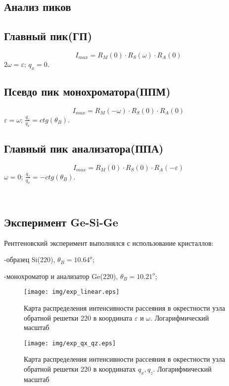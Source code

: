 \documentclass[journal]{IEEEtran}
\begin{document}
\textcolor{BrickRed}{\section{Анализ пиков}}
\textcolor{BrickRed}{\subsection{Главный пик(ГП)}}
$$I_{max} = R_M(0) \cdot R_S(\omega) \cdot R_A(0)$$
$2\omega = \varepsilon$; 
$q_x = 0$.
\textcolor{BrickRed}{\subsection{Псевдо пик монохроматора(ППМ)}}
$$I_{max} = R_M(-\omega) \cdot R_S(0) \cdot R_A(0)$$
$\varepsilon = \omega$; 
$\frac{q_z}{q_x} = ctg(\theta_B)$.
\textcolor{BrickRed}{\subsection{Главный пик анализатора(ППА)}}
$$I_{max} = R_M(0) \cdot R_S(0) \cdot R_A(-\varepsilon)$$
$\omega = 0$; 
$\frac{q_z}{q_x} = -ctg(\theta_B)$.

\hrulefill \\

\textcolor{BrickRed}{\section{Эксперимент Ge-Si-Ge}}
Рентгеновский эксперимент выполнялся с использование кристаллов:


-образец Si(220), $\theta_B = 10.64^o$;

-монохроматор и анализатор Ge(220),  $\theta_B = 10.21^o$;

\begin{figure}[H]
\centering
\texttt{[image: img/exp\_linear.eps]}
\caption{Карта распределения интенсивности рассеяния в окрестности узла обратной решетки 220 
в координата $\varepsilon$ и $\omega$. Логарифмический масштаб}
\label{ris:mapexper1}
\end{figure}


\begin{figure}[H]
\centering
\texttt{[image: img/exp\_qx\_qz.eps]}
\caption{Карта распределения интенсивности рассеяния в окрестности узла обратной решетки 220 
в координатах $q_x, q_z$. Логарифмический масштаб}
\label{ris:mapexper2}
\end{figure}


\hrulefill \\
\clearpage
\end{document}
